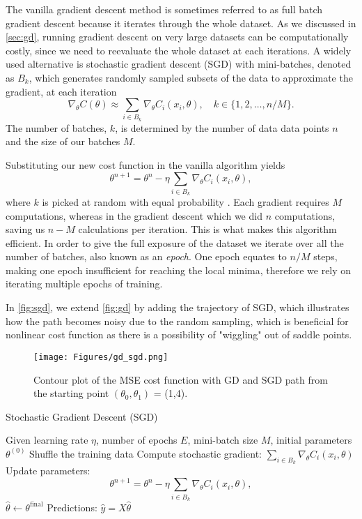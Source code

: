 \documentclass[amssymb,twocolumn,aps]{revtex4}
\begin{document}
The vanilla gradient descent method is sometimes referred to as full batch gradient descent because it iterates through the whole dataset. As we discussed in \autoref{sec:gd}, running gradient descent on very large datasets can be computationally costly, since we need to reevaluate the whole dataset at each iterations. A widely used  alternative is stochastic gradient descent (SGD) with mini-batches, denoted as $B_k$, which generates randomly sampled subsets of the data to approximate the gradient, at each iteration $$ \nabla_\theta C(\theta) \approx \sum_{i\in B_k} \nabla_\theta C_i (x_i,\theta), \quad k\in\{1,2, \dots , n/M\}.$$
The number of batches, $k$, is determined by the number of data data points $n$  and the size of our batches $M$.

Substituting our new cost function in the vanilla algorithm yields $$\theta^{n+1} = \theta^n - \eta\sum_{i\in B_k} \nabla_\theta C_i (x_i,\theta),$$
where $k$ is picked at random with equal probability \cite{fysml5}. Each gradient requires $M$ computations, whereas in the gradient descent which we did $n$ computations, saving us $n - M$ calculations per iteration. This is what makes this algorithm efficient. In order to give the full exposure of the dataset we iterate over all the number of batches, also known as an \textit{epoch}. One epoch equates to $n/M$ steps, making one epoch insufficient for reaching the local minima, therefore we rely on iterating multiple epochs of training.

In \autoref{fig:sgd}, we extend \autoref{fig:gd} by adding the trajectory of SGD, which illustrates how the path becomes noisy due to the random sampling, which is beneficial for nonlinear cost function as there is a possibility of "wiggling" out of saddle points. 

\begin{figure}[h]
    \centering
    \texttt{[image: Figures/gd\_sgd.png]}
    \caption{Contour plot of the MSE cost function with GD and SGD path from the starting point $(\theta_0, \theta_1)$ = (1,4).}
    \label{fig:sgd}
\end{figure}



\begin{algorithm}[H]
\caption{Stochastic Gradient Descent (SGD)}
\label{algorithm:SGD}
\begin{algorithmic}[1]
\State Given learning rate $\eta$, number of epochs $E$, mini-batch size $M$, initial parameters $\theta^{(0)}$
 
  \State Shuffle the training data
   
    \State Compute stochastic gradient: $\sum_{i\in B_k} \nabla_\theta C_i (x_i,\theta)$
    \State Update parameters: $$\theta^{n+1} = \theta^n - \eta\sum_{i\in B_k} \nabla_\theta C_i (x_i,\theta),$$
  \EndFor
\EndFor
\State $\hat{\theta} \gets \theta^{\text{final}}$
\State Predictions: $\hat{y} = X \hat{\theta}$
\end{algorithmic}
\end{algorithm}
\end{document}
